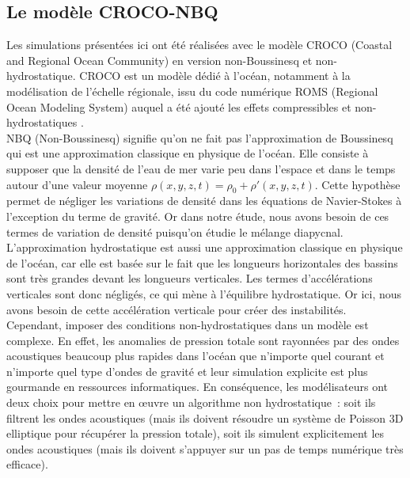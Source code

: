 \documentclass[a4paper,12pt]{article}
\begin{document}
    \subsection{Le modèle CROCO-NBQ}
    
    Les simulations présentées ici ont été réalisées avec le modèle CROCO (Coastal and Regional Ocean Community) en version non-Boussinesq et non-hydrostatique.
    CROCO est un modèle dédié à l'océan, notamment à la modélisation de l'échelle régionale, issu du code numérique ROMS (Regional Ocean Modeling System) auquel a été ajouté les effets compressibles et non-hydrostatiques \citep{auclair_non-hydrostatic_2018}. \\
    \newline
    NBQ (Non-Boussinesq) signifie qu'on ne fait pas l'approximation de Boussinesq qui est une approximation classique en physique de l'océan. Elle consiste à supposer que la densité de l'eau de mer varie peu dans l'espace et dans le temps autour d'une valeur moyenne $\rho(x,y,z,t)=\rho_{0}+\rho'(x,y,z,t)$. Cette hypothèse permet de négliger les variations de densité dans les équations de Navier-Stokes à l'exception du terme de gravité. Or dans notre étude, nous avons besoin de ces termes de variation de densité puisqu'on étudie le mélange diapycnal. \\
    \newline
    L'approximation hydrostatique est aussi une approximation classique en physique de l'océan, car elle est basée sur le fait que les longueurs horizontales des bassins sont très grandes devant les longueurs verticales. Les termes d'accélérations verticales sont donc négligés, ce qui mène à l'équilibre hydrostatique. Or ici, nous avons besoin de cette accélération verticale pour créer des instabilités. Cependant, imposer des conditions non-hydrostatiques dans un modèle est complexe. En effet, les anomalies de pression totale sont rayonnées par des ondes acoustiques beaucoup plus rapides dans l'océan que n'importe quel courant et n'importe quel type d'ondes de gravité et leur simulation explicite est plus gourmande en ressources informatiques. En conséquence, les modélisateurs ont deux choix pour mettre en œuvre un algorithme non hydrostatique : soit ils filtrent les ondes acoustiques (mais ils doivent résoudre un système de Poisson 3D elliptique pour récupérer la pression totale), soit ils simulent explicitement les ondes acoustiques (mais ils doivent s'appuyer sur un pas de temps numérique très efficace).
\end{document}

